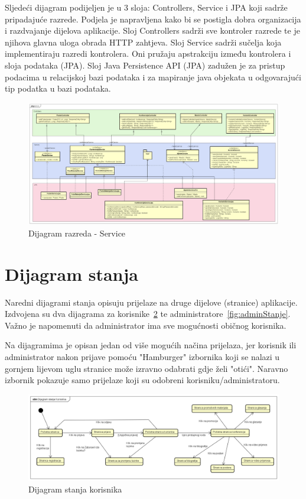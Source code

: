		\newpage
		Sljedeći dijagram podijeljen je u 3 sloja: Controllers, Service i JPA koji sadrže pripadajuće razrede. Podjela je napravljena kako bi se postigla dobra organizacija i razdvajanje dijelova aplikacije. Sloj Controllers sadrži sve kontroler razrede te je njihova glavna uloga obrada HTTP zahtjeva. Sloj Service sadrži sučelja koja implementiraju razredi kontrolera. Oni pružaju apstrakciju između kontrolera i sloja podataka (JPA). Sloj Java Persistence API (JPA) zadužen je za pristup podacima u relacijskoj bazi podataka i za mapiranje java objekata u odgovarajući tip podatka u bazi podataka.
		\begin{figure}[H]
			\includegraphics[width=\textwidth]{slike/serviceClassDiagram.PNG} %
			\caption{Dijagram razreda - Service}
			\label{fig:dr-service} %
		\end{figure}
			\eject

		\section{Dijagram stanja}

			Naredni dijagrami stanja opisuju prijelaze na druge dijelove (stranice) aplikacije. Izdvojena su dva dijagrama za korisnike~\ref{fig:korisnikStanje} te administratore~\ref{fig:adminStanje}. Važno je napomenuti da administrator ima sve mogućnosti običnog korisnika.
			
			Na dijagramima je opisan jedan od više mogućih načina prijelaza, jer korisnik ili administrator nakon prijave pomoću "Hamburger" izbornika koji se nalazi u gornjem lijevom uglu stranice može izravno odabrati gdje želi "otići". Naravno izbornik pokazuje samo prijelaze koji su odobreni korisniku/administratoru. 
			
			\begin{figure}[H]
				\includegraphics[width=\textwidth]{slike/korisnikStanja.PNG} %
				\caption{Dijagram stanja korisnika}
				\label{fig:korisnikStanje} %
			\end{figure}
			
